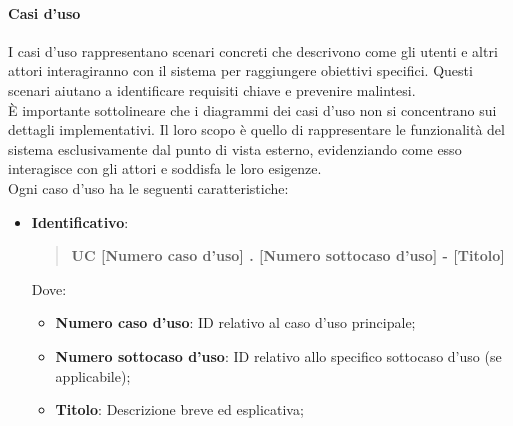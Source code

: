 \documentclass[10pt]{article}
\begin{document}
\begin{justify}
        \paragraph{Casi d'uso}
        I casi d'uso rappresentano scenari concreti che descrivono come gli utenti e altri attori interagiranno con il sistema per raggiungere obiettivi specifici. Questi scenari aiutano a identificare requisiti chiave e prevenire malintesi.\\
        È importante sottolineare che i diagrammi dei casi d'uso non si concentrano sui dettagli implementativi. Il loro scopo è quello di rappresentare le funzionalità del sistema esclusivamente dal punto di vista esterno, evidenziando come esso interagisce con gli attori e soddisfa le loro esigenze.\\
        Ogni caso d'uso ha le seguenti caratteristiche:
        \begin{itemize}
            \item \textbf{Identificativo}:
            \begin{quote}
                \textbf{UC [Numero caso d'uso] . [Numero sottocaso d'uso] - [Titolo]}
            \end{quote}
            Dove:
            \begin{itemize}
                \item \textbf{Numero caso d'uso}: ID relativo al caso d'uso principale;
                \item \textbf{Numero sottocaso d'uso}: ID relativo allo specifico sottocaso d'uso (se applicabile);
                \item \textbf{Titolo}: Descrizione breve ed esplicativa;
            \end{itemize}


\end{itemize}
\end{justify}
\end{document}
